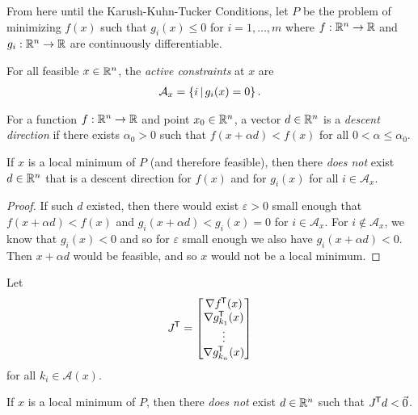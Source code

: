 \begin{rmk}
    From here until the Karush-Kuhn-Tucker Conditions, let $P$ be the problem of minimizing $f(x)$ such that $g_i(x) \leq 0$ for $i = 1, \ldots, m$ where $f: \mathbb{R}^n \to \mathbb{R}$ and $g_i: \mathbb{R}^n \to \mathbb{R}$ are continuously differentiable.
\end{rmk}

\begin{defn}
    For all feasible $x \in \mathbb{R}^n$, the \emph{active constraints} at $x$ are
    \begin{align*}
        \mathcal{A}_x = \left\{i \,\middle|\, g_i(x) = 0\right\}.
    \end{align*}
\end{defn}

\begin{defn}
    For a function $f: \mathbb{R}^n \to \mathbb{R}$ and point $x_0 \in \mathbb{R}^n$, a vector $d \in \mathbb{R}^n$ is a \emph{descent direction} if there exists $\alpha_0 > 0$ such that $f(x + \alpha d) < f(x)$ for all $0 < \alpha \leq \alpha_0$.
\end{defn}

\begin{lemma}\label{kkt-lemma-1}
    If $x$ is a local minimum of $P$ (and therefore feasible), then there \emph{does not} exist $d \in \mathbb{R}^n$ that is a descent direction for $f(x)$ and for $g_i(x)$ for all $i \in \mathcal{A}_x$. 
\end{lemma}

\begin{proof}
    If such $d$ existed, then there would exist $\varepsilon > 0$ small enough that $f(x + \alpha d) < f(x)$ and $g_i(x + \alpha d) < g_i(x) = 0$ for $i \in \mathcal{A}_x$. For $i \notin \mathcal{A}_x$, we know that $g_i(x) < 0$ and so for $\varepsilon$ small enough we also have $g_i(x + \alpha d) < 0$. Then $x + \alpha d$ would be feasible, and so $x$ would not be a local minimum.
\end{proof}

\begin{lemma}\label{kkt-lemma-2}
    Let
    \begin{align*}
        J^{\mkern-1.5mu\mathsf{T}} = \begin{bmatrix}
            \nabla f^{\mkern-1.5mu\mathsf{T}}(x) \\ \nabla g_{k_1}^{\mkern-1.5mu\mathsf{T}}(x) \\ \vdots \\ \nabla g_{k_n}^{\mkern-1.5mu\mathsf{T}}(x)
        \end{bmatrix}
    \end{align*}
    for all $k_i \in \mathcal{A}(x)$.

    If $x$ is a local minimum of $P$, then there \emph{does not} exist $d \in \mathbb{R}^n$ such that $J^{\mkern-1.5mu\mathsf{T}}d < \vec{0}$.
\end{lemma}

